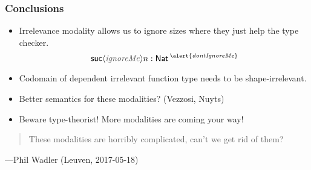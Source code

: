 \documentclass[t]{beamer}
\newcommand{\cAnn}{\color{red!80!black}}%
\renewcommand{\emph}[1]{{\cAnn#1}}
\begin{document}
\begin{frame}%
  \frametitle{Conclusions}
  \begin{itemize}
  \item Irrelevance modality allows us to ignore sizes where they just help the type checker.
\[
  \suc {{\color{grey}\mathit{ignoreMe}}} n : \Nat^{\alert{\mathit{dontIgnoreMe}}}
\]
\vspace{-2ex}
  \item Codomain of dependent irrelevant function type needs to be \emph{shape-irrelevant}.
  \item Better semantics for these modalities? (Vezzosi, Nuyts)
  \item Beware type-theorist! More modalities are coming your way!
  \end{itemize}
\end{frame}


\begin{frame}%
\vfill
\begin{quotation}
  These modalities are horribly complicated, can't we get rid of them?
\end{quotation}
\begin{flushright}
---Phil Wadler (Leuven, 2017-05-18)
\end{flushright}
\vfill
\end{frame}



% 
\end{document}
